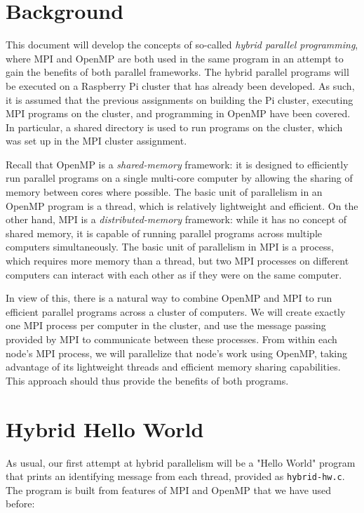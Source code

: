 \documentclass{article}
\theoremstyle{definition}
\begin{document}
\section{Background}

This document will develop the concepts of so-called \emph{hybrid parallel programming}, where MPI and OpenMP are both used in the same program in an attempt to gain the benefits of both parallel frameworks. The hybrid parallel programs will be executed on a Raspberry Pi cluster that has already been developed. As such, it is assumed that the previous assignments on building the Pi cluster, executing MPI programs on the cluster, and programming in OpenMP have been covered. In particular, a shared directory is used to run programs on the cluster, which was set up in the MPI cluster assignment.

Recall that OpenMP is a \emph{shared-memory} framework: it is designed to efficiently run parallel programs on a single multi-core computer by allowing the sharing of memory between cores where possible. The basic unit of parallelism in an OpenMP program is a thread, which is relatively lightweight and efficient. On the other hand, MPI is a \emph{distributed-memory} framework: while it has no concept of shared memory, it is capable of running parallel programs across multiple computers simultaneously. The basic unit of parallelism in MPI is a process, which requires more memory than a thread, but two MPI processes on different computers can interact with each other as if they were on the same computer.

In view of this, there is a natural way to combine OpenMP and MPI to run efficient parallel programs across a cluster of computers. We will create exactly one MPI process per computer in the cluster, and use the message passing provided by MPI to communicate between these processes. From within each node's MPI process, we will parallelize that node's work using OpenMP, taking advantage of its lightweight threads and efficient memory sharing capabilities. This approach should thus provide the benefits of both programs.

\section{Hybrid Hello World}

As usual, our first attempt at hybrid parallelism will be a "Hello World" program that prints an identifying message from each thread, provided as \texttt{hybrid-hw.c}. The program is built from features of MPI and OpenMP that we have used before:
\end{document}
